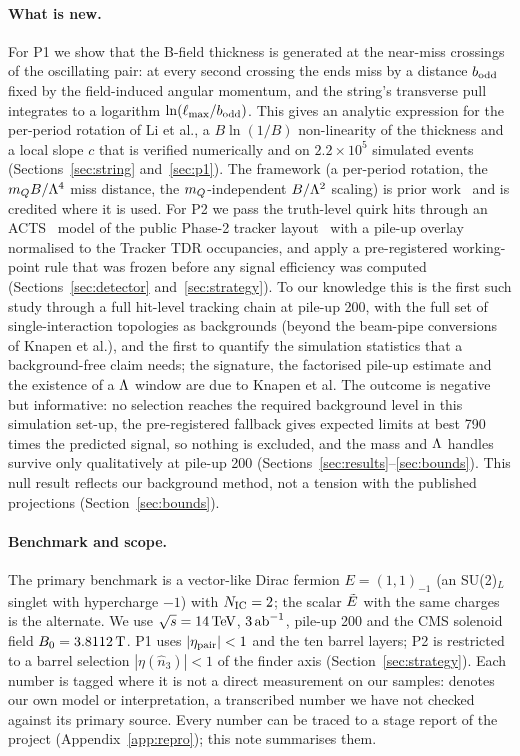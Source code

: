 \paragraph{What is new.} For P1 we show that the B-field thickness is generated at the near-miss crossings of the
oscillating pair: at every second crossing the ends miss by a distance $b_{\rm odd}$ fixed by the field-induced angular
momentum, and the string's transverse pull integrates to a logarithm $\ln(\ell_{\max}/b_{\rm odd})$. This gives an analytic
expression for the per-period rotation of Li et al., a $B\ln(1/B)$ non-linearity of the thickness and a local slope
$c$ that is verified numerically and on $2.2\times10^5$ simulated events (Sections~\ref{sec:string}
and~\ref{sec:p1}). The framework (a per-period rotation, the $m_Q B/\Lambda^4$ miss distance, the $m_Q$-independent
$B/\Lambda^2$ scaling) is prior work~\cite{Kang:2008ea,Knapen:2017kly,Li:2020aoq} and is credited where it is used. For P2
we pass the truth-level quirk hits through an ACTS~\cite{Ai:2021ghi} model of the public Phase-2 tracker
layout~\cite{CMS:2017lum} with a pile-up overlay normalised to the Tracker TDR occupancies, and apply a pre-registered
working-point rule that was frozen before any signal efficiency was computed (Sections~\ref{sec:detector}
and~\ref{sec:strategy}). To our knowledge this is the first such study through a full hit-level tracking chain at
pile-up 200, with the full set of single-interaction topologies as backgrounds (beyond the beam-pipe conversions of
Knapen et al.), and the first to quantify the simulation statistics that
a background-free claim needs; the signature, the factorised pile-up estimate and the existence of a $\Lambda$ window are due
to Knapen et al. The outcome is negative but informative: no selection reaches the required background level in
this simulation set-up, the pre-registered fallback gives expected limits at best 790 times the predicted signal, so
nothing is excluded, and the mass and $\Lambda$ handles survive only qualitatively at pile-up 200
(Sections~\ref{sec:results}--\ref{sec:bounds}). This null result reflects our background method, not a tension with the
published projections (Section~\ref{sec:bounds}).

\paragraph{Benchmark and scope.} The primary benchmark is a vector-like Dirac fermion $E=(1,1)_{-1}$ (an SU(2)$_L$
singlet with hypercharge $-1$) with $N_{\rm IC}=2$; the scalar $\tilde{E}$ with the same charges is the alternate. We use
$\sqrt s=14\,\mathrm{TeV}$, $3\,\mathrm{ab}^{-1}$, pile-up 200 and the CMS solenoid field $B_0=3.8112\,\mathrm{T}$. P1 uses $|\eta_{\rm pair}|<1$
and the ten barrel layers; P2 is restricted to a barrel selection $|\eta(\hat n_3)|<1$ of the finder axis
(Section~\ref{sec:strategy}). Each number is tagged where it is not a direct measurement on our samples: \EST{} denotes
our own model or interpretation, \UNV{} a transcribed number we have not checked against its primary source. Every
number can be traced to a stage report of the project (Appendix~\ref{app:repro}); this note summarises them.

